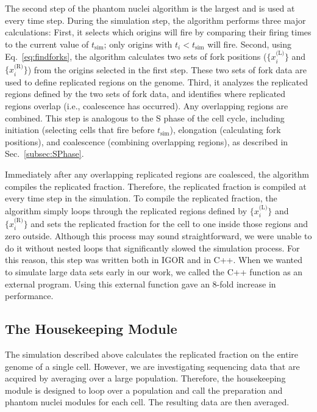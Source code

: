 		The second step of the phantom nuclei algorithm is the largest and is used at every time step.
		During the simulation step, the algorithm performs three major calculations:
		First, it selects which origins will fire by comparing their firing times to the current value of $t_\text{sim}$; only origins with $t_i < t_\text{sim}$ will fire.
		Second, using Eq.~\ref{eq:findforks}, the algorithm calculates two sets of fork positions ($\{x_i^\text{(L)}\}$ and $\{x_i^\text{(R)}\}$) from the origins selected in the first step.
		These two sets of fork data are used to define replicated regions on the genome.
		Third, it analyzes the replicated regions defined by the two sets of fork data, and identifies where replicated regions overlap (i.e., coalescence has occurred).
		Any overlapping regions are combined.
		This step is analogous to the S phase of the cell cycle, including initiation (selecting cells that fire before $t_\text{sim}$), elongation (calculating fork positions), and coalescence (combining overlapping regions), as described in Sec.~\ref{subsec:SPhase}.
		
		Immediately after any overlapping replicated regions are coalesced, the algorithm compiles the replicated fraction.
		Therefore, the replicated fraction is compiled at every time step in the simulation.
		To compile the replicated fraction, the algorithm simply loops through the replicated regions defined by $\{x_i^\text{(L)}\}$ and $\{x_i^\text{(R)}\}$ and sets the replicated fraction for the cell to one inside those regions and zero outside.
		Although this process may sound straightforward, we were unable to do it without nested loops that significantly slowed the simulation process.
		For this reason, this step was written both in IGOR and in C++.
		When we wanted to simulate large data sets early in our work, we called the C++ function as an external program.
		Using this external function gave an 8-fold increase in performance.
		
		
		\subsection{The Housekeeping Module}
		\label{subsec:Housing}
		
		The simulation described above calculates the replicated fraction on the entire genome of a single cell.
		However, we are investigating sequencing data that are acquired by averaging over a large population.
		Therefore, the housekeeping module is designed to loop over a population and call the preparation and phantom nuclei modules for each cell.
		The resulting data are then averaged.
		
